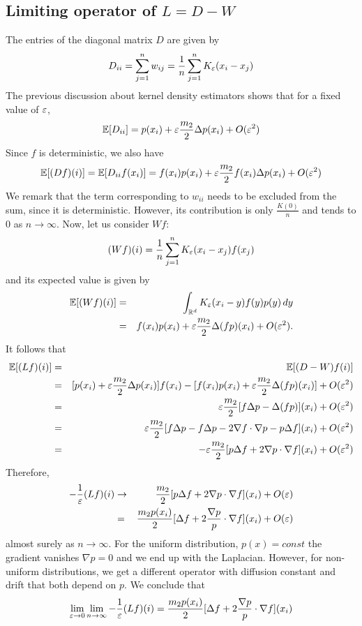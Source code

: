 \subsection{Limiting operator of $L = D-W$}
The entries of the diagonal matrix $D$ are given by
$$D_{ii} = \sum_{j=1}^n w_{ij} = \frac{1}{n}\sum_{j=1}^n K_{\varepsilon}(x_i - x_j)$$
The previous discussion about kernel density estimators shows that for a fixed value of $\varepsilon$,
$$\mathbb{E}[D_{ii}] = p(x_i) + \varepsilon\frac{m_2}{2}\Delta p(x_i) + O(\varepsilon^2)$$
Since $f$ is deterministic, we also have
$$\mathbb{E}[(Df)(i)] = \mathbb{E}[D_{ii}f(x_i)] = f(x_i)p(x_i) + \varepsilon\frac{m_2}{2}f(x_i)\Delta p(x_i) + O(\varepsilon^2)$$
We remark that the term corresponding to $w_{ii}$ needs to be excluded from the sum, since it is deterministic. However, its contribution is only $\frac{K(0)}{n}$ and tends to 0 as $n\to \infty$.
Now, let us consider $Wf$:
$$(Wf)(i) = \frac{1}{n}\sum_{j=1}^n K_{\varepsilon}(x_i-x_j)f(x_j)$$
and its expected value is given by
\begin{eqnarray*}
\mathbb{E}[(Wf)(i)] &=& \int_{\mathbb{R}^d} K_{\varepsilon}(x_i-y)f(y)p(y)\,dy \\
&=& f(x_i)p(x_i) + \varepsilon\frac{m_2}{2}\Delta(fp)(x_i) + O(\varepsilon^2).
\end{eqnarray*}
It follows that
\begin{eqnarray*}
\mathbb{E}[(Lf)(i)] &=& \mathbb{E}[(D-W)f(i)] \\
&=& [p(x_i) + \varepsilon\frac{m_2}{2}\Delta p(x_i)]f(x_i) - [f(x_i)p(x_i) + \varepsilon\frac{m_2}{2}\Delta(fp)(x_i)] + O(\varepsilon^2) \\
&=& \varepsilon\frac{m_2}{2} [f\Delta p - \Delta(fp)](x_i) + O(\varepsilon^2) \\
&=& \varepsilon\frac{m_2}{2} [f\Delta p - f\Delta p - 2\nabla f \cdot \nabla p - p\Delta f](x_i) + O(\varepsilon^2)\\
&=& -\varepsilon\frac{m_2}{2} [p\Delta f + 2\nabla p \cdot \nabla f](x_i) + O(\varepsilon^2)
\end{eqnarray*}
Therefore,
\begin{eqnarray*}
-\frac{1}{\varepsilon}(Lf)(i) &\to& \frac{m_2}{2} [p\Delta f + 2\nabla p \cdot \nabla f](x_i) + O(\varepsilon) \\
&=& \frac{m_2 p(x_i)}{2} [\Delta f + 2\frac{\nabla p}{p} \cdot \nabla f](x_i) + O(\varepsilon)
\end{eqnarray*}
almost surely as $n\to \infty$. For the uniform distribution, $p(x)=const$ the gradient vanishes $\nabla p = 0$ and we end up with the Laplacian. However, for non-uniform distributions, we get a different operator with diffusion constant and drift that both depend on $p$. We conclude that
$$\lim_{\varepsilon\to 0}\lim_{n\to \infty} -\frac{1}{\varepsilon}(Lf)(i) = \frac{m_2 p(x_i)}{2} [\Delta f + 2\frac{\nabla p}{p} \cdot \nabla f](x_i)$$


